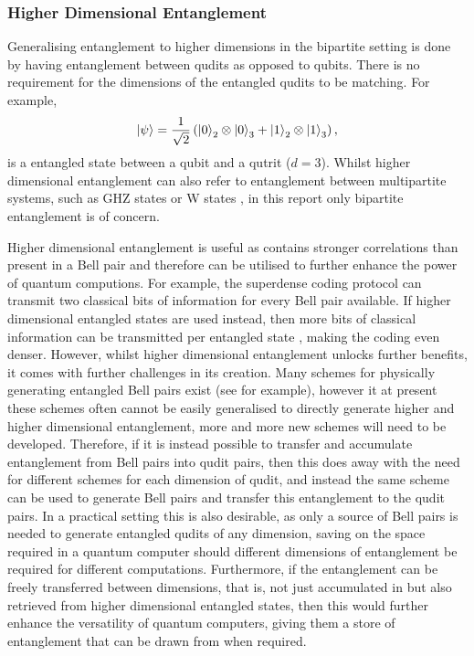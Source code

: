 \subsubsection{Higher Dimensional Entanglement}
Generalising entanglement to higher dimensions in the bipartite setting is done by having entanglement between qudits as opposed to qubits.
There is no requirement for the dimensions of the entangled qudits to be matching.
For example,
\begin{equation}
    \ket{\psi} = \frac{1}{\sqrt{2}}\left(\ket{0}_2\otimes\ket{0}_3 + \ket{1}_2\otimes\ket{1}_3\right),
\end{equation}
is a entangled state between a qubit and a qutrit ($d=3$).
Whilst higher dimensional entanglement can also refer to entanglement between multipartite systems, such as GHZ states or W states \cite{bengtsson2016brief}, in this report only bipartite entanglement is of concern.

Higher dimensional entanglement is useful as contains stronger correlations than present in a Bell pair and therefore can be utilised to further enhance the power of quantum computions.
For example, the superdense coding protocol can transmit two classical bits of information for every Bell pair available.
If higher dimensional entangled states are used instead, then more bits of classical information can be transmitted per entangled state \cite{Liu_2002}, making the coding even denser.
However, whilst higher dimensional entanglement unlocks further benefits, it comes with further challenges in its creation.
Many schemes for physically generating entangled Bell pairs exist (see for example\cite{Browne_2003, Wei_2006, Messina_2002}), however it at present these schemes often cannot be easily generalised to directly generate higher and higher dimensional entanglement, more and more new schemes will need to be developed.
Therefore, if it is instead possible to transfer and accumulate entanglement from Bell pairs into qudit pairs, then this does away with the need for different schemes for each dimension of qudit, and instead the same scheme can be used to generate Bell pairs and transfer this entanglement to the qudit pairs.
In a practical setting this is also desirable, as only a source of Bell pairs is needed to generate entangled qudits of any dimension, saving on the space required in a quantum computer should different dimensions of entanglement be required for different computations.
Furthermore, if the entanglement can be freely transferred between dimensions, that is, not just accumulated in but also retrieved from higher dimensional entangled states, then this would further enhance the versatility of quantum computers, giving them a store of entanglement that can be drawn from when required.


